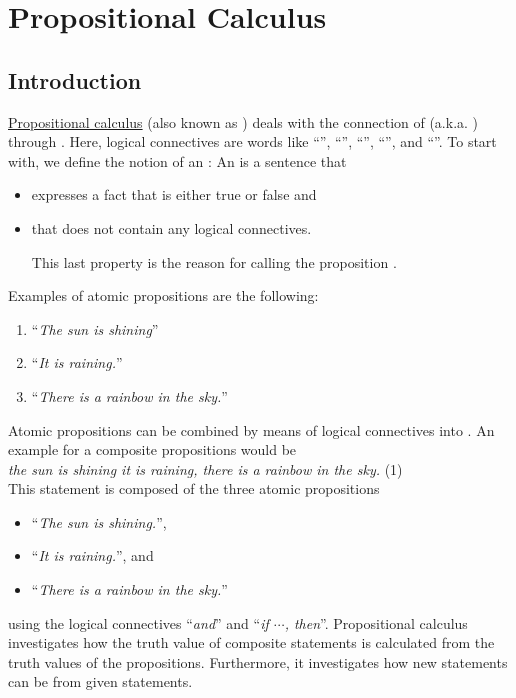 \chapter{Propositional Calculus}
\section{Introduction}
\href{https://en.wikipedia.org/wiki/Propositional_calculus}{Propositional calculus}
(also known as ) deals with the connection of
(a.k.a. ) through 
.  Here, logical connectives are words like ``'', ``'',
``'', ``'', and ``''.  To
start with, we define the notion of an : An
 is a sentence  that 
\begin{itemize}
\item expresses a fact that is either true or false and
\item that does not contain any logical connectives.

      This last property is the reason for calling the proposition .
\end{itemize}
Examples of atomic propositions are the following:
\begin{enumerate}
\item ``\textsl{The sun is shining}''
\item ``\textsl{It is raining.}''
\item ``\textsl{There is a rainbow in the sky.}''
\end{enumerate}
Atomic propositions can be combined by means of logical connectives
into .  An example for a
composite propositions would be
\\[0.2cm] 
\hspace*{1.3cm}
\textsl{ the sun is shining  it is raining,  there is a rainbow in the sky.} 
\hspace*{\fill} (1)
\\[0.2cm]
This statement is composed of the three atomic propositions
\begin{itemize}
\item ``\textsl{The sun is shining.}'', 
\item ``\textsl{It is raining.}'', and
\item ``\textsl{There is a rainbow in the sky.}''
\end{itemize}
using the logical connectives ``\textsl{and}'' and ``\textsl{if $\cdots$, then}''.
Propositional calculus investigates how the truth value of composite statements is
calculated from the truth values of the propositions.  Furthermore, it investigates
how new statements can be  from given statements. 

